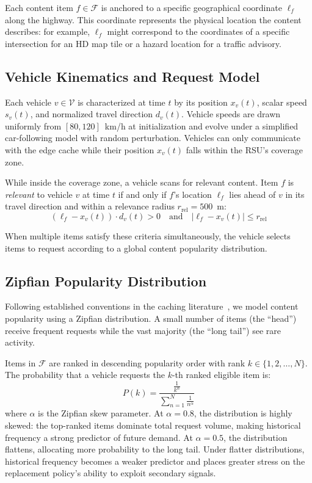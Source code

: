 \documentclass[preprint,12pt]{elsarticle}
\begin{document}
	Each content item $f \in \mathcal{F}$ is anchored to a specific geographical coordinate $\ell_f$ along the highway. This coordinate represents the physical location the content describes: for example, $\ell_f$ might correspond to the coordinates of a specific intersection for an HD map tile or a hazard location for a traffic advisory.
	
	\subsection{Vehicle Kinematics and Request Model}
	
	Each vehicle $v \in \mathcal{V}$ is characterized at time $t$ by its position $x_v(t)$, scalar speed $s_v(t)$, and normalized travel direction $d_v(t)$. Vehicle speeds are drawn uniformly from $[80, 120]$~km/h at initialization and evolve under a simplified car-following model with random perturbation. Vehicles can only communicate with the edge cache while their position $x_v(t)$ falls within the RSU's coverage zone.
	
	While inside the coverage zone, a vehicle scans for relevant content. Item $f$ is \emph{relevant} to vehicle $v$ at time $t$ if and only if $f$'s location $\ell_f$ lies ahead of $v$ in its travel direction and within a relevance radius $r_\text{rel} = 500$~m:
	\begin{equation}
		(\ell_f - x_v(t)) \cdot d_v(t) > 0 \quad \text{and} \quad |\ell_f - x_v(t)| \leq r_\text{rel}
		\label{eq:relevance}
	\end{equation}
	
	When multiple items satisfy these criteria simultaneously, the vehicle selects items to request according to a global content popularity distribution.
	
	\subsection{Zipfian Popularity Distribution}
	
	Following established conventions in the caching literature~\cite{breslau1999web}, we model content popularity using a Zipfian distribution. A small number of items (the ``head'') receive frequent requests while the vast majority (the ``long tail'') see rare activity.
	
	Items in $\mathcal{F}$ are ranked in descending popularity order with rank $k \in \{1, 2, \dots, N\}$. The probability that a vehicle requests the $k$-th ranked eligible item is:
	\begin{equation}
		P(k) = \frac{\frac{1}{k^\alpha}}{\sum_{n=1}^{N} \frac{1}{n^\alpha}}
		\label{eq:zipf}
	\end{equation}
	where $\alpha$ is the Zipfian skew parameter. At $\alpha = 0.8$, the distribution is highly skewed: the top-ranked items dominate total request volume, making historical frequency a strong predictor of future demand. At $\alpha = 0.5$, the distribution flattens, allocating more probability to the long tail. Under flatter distributions, historical frequency becomes a weaker predictor and places greater stress on the replacement policy's ability to exploit secondary signals.
	
\end{document}
